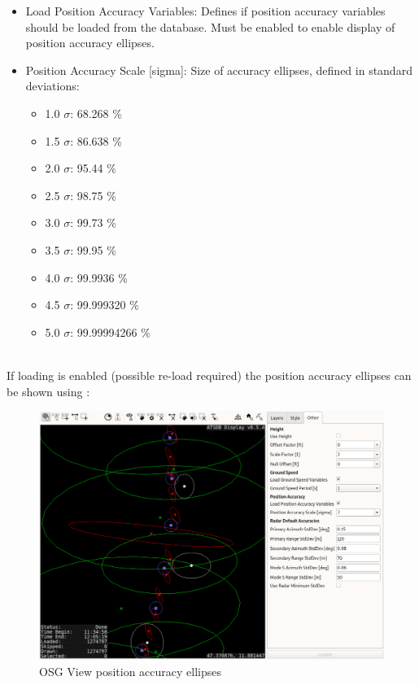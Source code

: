 \begin{itemize}
 \item Load Position Accuracy Variables: Defines if position accuracy variables should be loaded from the database. Must be enabled to enable display of position accuracy ellipses.
 \item Position Accuracy Scale [sigma]: Size of accuracy ellipses, defined in standard deviations:
 \begin{itemize}
    \item 1.0 $\sigma$: 68.268 \%
    \item 1.5 $\sigma$: 86.638 \%
    \item 2.0 $\sigma$: 95.44 \%
    \item 2.5 $\sigma$: 98.75 \%
    \item 3.0 $\sigma$: 99.73 \%
    \item 3.5 $\sigma$: 99.95 \%
    \item 4.0 $\sigma$: 99.9936 \%
    \item 4.5 $\sigma$: 99.999320 \%
    \item 5.0 $\sigma$: 99.99994266 \%
\end{itemize}  
\end{itemize}
\ \\

If loading is enabled (possible re-load required) the position accuracy ellipses can be shown using :

\begin{figure}[H]
    \hspace*{-2.5cm}
    \includegraphics[width=19cm,frame]{../screenshots/osgview_accuracy_ellipses.png}
  \caption{OSG View position accuracy ellipses}
\end{figure} 

